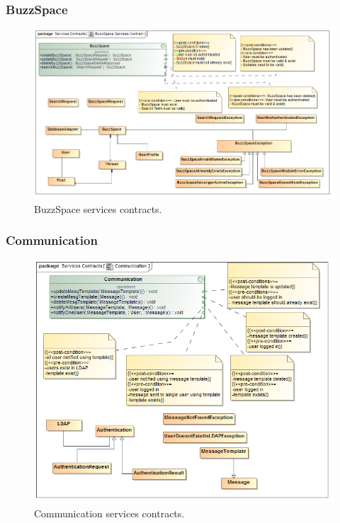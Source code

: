 \documentclass [a4paper,12pt] {article}
\begin{document}
		\subsubsection{BuzzSpace}
					\begin{figure}[H]
						\centering
						\includegraphics[width=1.0\textwidth]{BuzzSpaceSC.png}
						\caption{BuzzSpace services contracts.}
					\end{figure}
		\subsubsection{Communication}
			\begin{figure}[H]
				\centering
				\includegraphics[width=1.0\textwidth]{CommunicationSC.png}
				\caption{Communication services contracts.}
			\end{figure}
		
\end{document}
